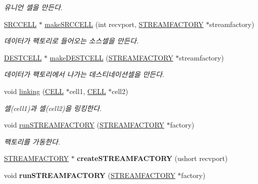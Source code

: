 \begin{DoxyCompactItemize}
\begin{DoxyCompactList}\small\item\em 유니언 셀을 만든다. \end{DoxyCompactList}\item 
\hyperlink{classSRCCELL}{S\+R\+C\+C\+E\+L\+L} $\ast$ \hyperlink{classFACTORYBUILDER_a1378efcb11e24157cfbdb325e9cbaf2b}{make\+S\+R\+C\+C\+E\+L\+L} (int recvport, \hyperlink{classSTREAMFACTORY}{S\+T\+R\+E\+A\+M\+F\+A\+C\+T\+O\+R\+Y} $\ast$streamfactory)
\begin{DoxyCompactList}\small\item\em 데이터가 팩토리로 들어오는 소스셀을 만든다. \end{DoxyCompactList}\item 
\hyperlink{classDESTCELL}{D\+E\+S\+T\+C\+E\+L\+L} $\ast$ \hyperlink{classFACTORYBUILDER_ab56a2ef6e49fa0370c3b1138e2350d01}{make\+D\+E\+S\+T\+C\+E\+L\+L} (\hyperlink{classSTREAMFACTORY}{S\+T\+R\+E\+A\+M\+F\+A\+C\+T\+O\+R\+Y} $\ast$streamfactory)
\begin{DoxyCompactList}\small\item\em 데이터가 팩토리에서 나가는 데스티네이션셀을 만든다. \end{DoxyCompactList}\item 
void \hyperlink{classFACTORYBUILDER_ae81ea804ccbb07ef47f94c65e913d597}{linking} (\hyperlink{classCELL}{C\+E\+L\+L} $\ast$cell1, \hyperlink{classCELL}{C\+E\+L\+L} $\ast$cell2)
\begin{DoxyCompactList}\small\item\em 셀(cell1)과 셀(cell2)을 링킹한다. \end{DoxyCompactList}\item 
void \hyperlink{classFACTORYBUILDER_a47d4f78877f1fa2a6b4bc00a4c5c4471}{run\+S\+T\+R\+E\+A\+M\+F\+A\+C\+T\+O\+R\+Y} (\hyperlink{classSTREAMFACTORY}{S\+T\+R\+E\+A\+M\+F\+A\+C\+T\+O\+R\+Y} $\ast$factory)
\begin{DoxyCompactList}\small\item\em 팩토리를 가동한다. \end{DoxyCompactList}\item 
\hypertarget{classFACTORYBUILDER_a1f2abb3549a23a2fc2e25c361ad3f2fa}{}\hyperlink{classSTREAMFACTORY}{S\+T\+R\+E\+A\+M\+F\+A\+C\+T\+O\+R\+Y} $\ast$ {\bfseries create\+S\+T\+R\+E\+A\+M\+F\+A\+C\+T\+O\+R\+Y} (ushort recvport)\label{classFACTORYBUILDER_a1f2abb3549a23a2fc2e25c361ad3f2fa}

\item 
\hypertarget{classFACTORYBUILDER_a47d4f78877f1fa2a6b4bc00a4c5c4471}{}void {\bfseries run\+S\+T\+R\+E\+A\+M\+F\+A\+C\+T\+O\+R\+Y} (\hyperlink{classSTREAMFACTORY}{S\+T\+R\+E\+A\+M\+F\+A\+C\+T\+O\+R\+Y} $\ast$factory)\label{classFACTORYBUILDER_a47d4f78877f1fa2a6b4bc00a4c5c4471}


\end{DoxyCompactItemize}
